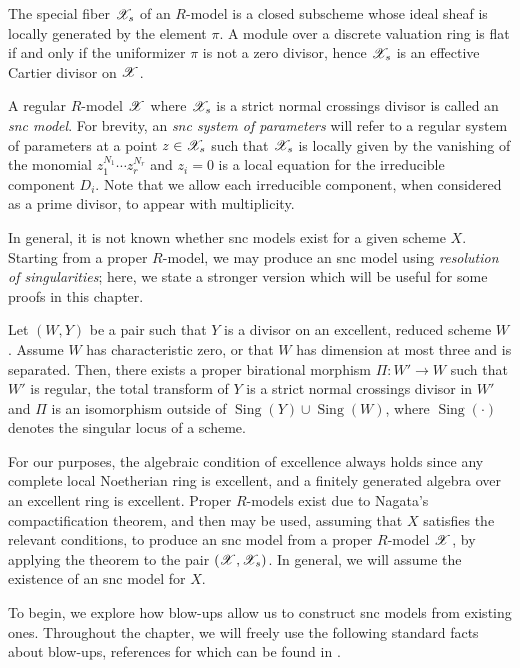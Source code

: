 The special fiber $\mathscr{X}_{s}$ of an $R$-model is a closed subscheme whose ideal sheaf is locally generated by the element $\pi$. 
A module over a discrete valuation ring is flat if and only if the uniformizer $\pi$ is not a zero divisor, hence $\mathscr{X}_{s}$ is an effective Cartier divisor on $\mathscr{X}$.

A regular $R$-model $\mathscr{X}$ where $\mathscr{X}_s$ is a strict normal crossings divisor is called an \textit{snc model}.
For brevity, an \textit{snc system of parameters} will refer to a regular system of parameters at a point $z \in \mathscr{X}_s$ such that $\mathscr{X}_s$ is locally given by the vanishing of the monomial $z_1^{N_1} \cdots z_r^{N_r}$ and $z_i = 0$ is a local equation for the irreducible component $D_i$.
Note that we allow each irreducible component, when considered as a prime divisor, to appear with multiplicity.

In general, it is not known whether snc models exist for a given scheme $X$.
Starting from a proper $R$-model, we may produce an snc model using \textit{resolution of singularities}; here, we state a stronger version which will be useful for some proofs in this chapter.

\begin{theorem} \label{resofsing} \parencite{hironaka, hauserresolution, cossart1, cossart2}
Let $(W, Y)$ be a pair such that $Y$ is a divisor on an excellent, reduced scheme $W$.
Assume $W$ has characteristic zero, or that $W$ has dimension at most three and is separated.
Then, there exists a proper birational morphism $\Pi: W' \to W$ such that $W'$ is regular, the total transform of $Y$ is a strict normal crossings divisor in $W'$ and $\Pi$ is an isomorphism outside of $\operatorname{Sing}(Y) \cup \operatorname{Sing}(W)$, where $\operatorname{Sing}(\cdot)$ denotes the singular locus of a scheme.
\end{theorem}

For our purposes, the algebraic condition of excellence always holds since any complete local Noetherian ring is excellent, and a finitely generated algebra over an excellent ring is excellent.
Proper $R$-models exist due to Nagata's compactification theorem, and then  may be used, assuming that $X$ satisfies the relevant conditions, to produce an snc model from a proper $R$-model $\mathscr{X}$, by applying the theorem to the pair $(\mathscr{X}, \mathscr{X}_s)$.
In general, we will assume the existence of an snc model for $X$.

To begin, we explore how blow-ups allow us to construct snc models from existing ones.
Throughout the chapter, we will freely use the following standard facts about blow-ups, references for which can be found in \parencite[Chapter 8]{liu}.

